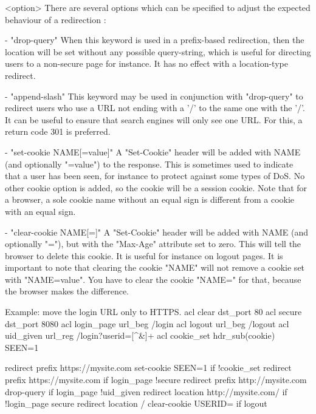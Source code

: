     <option>  There are several options which can be specified to adjust the
              expected behaviour of a redirection :

      - "drop-query"
        When this keyword is used in a prefix-based redirection, then the
        location will be set without any possible query-string, which is useful
        for directing users to a non-secure page for instance. It has no effect
        with a location-type redirect.

      - "append-slash"
        This keyword may be used in conjunction with "drop-query" to redirect
        users who use a URL not ending with a '/' to the same one with the '/'.
        It can be useful to ensure that search engines will only see one URL.
        For this, a return code 301 is preferred.

      - "set-cookie NAME[=value]"
        A "Set-Cookie" header will be added with NAME (and optionally "=value")
        to the response. This is sometimes used to indicate that a user has
        been seen, for instance to protect against some types of DoS. No other
        cookie option is added, so the cookie will be a session cookie. Note
        that for a browser, a sole cookie name without an equal sign is
        different from a cookie with an equal sign.

      - "clear-cookie NAME[=]"
        A "Set-Cookie" header will be added with NAME (and optionally "="), but
        with the "Max-Age" attribute set to zero. This will tell the browser to
        delete this cookie. It is useful for instance on logout pages. It is
        important to note that clearing the cookie "NAME" will not remove a
        cookie set with "NAME=value". You have to clear the cookie "NAME=" for
        that, because the browser makes the difference.

  Example: move the login URL only to HTTPS.
        acl clear      dst_port  80
        acl secure     dst_port  8080
        acl login_page url_beg   /login
        acl logout     url_beg   /logout
        acl uid_given  url_reg   /login?userid=[^&]+
        acl cookie_set hdr_sub(cookie) SEEN=1

        redirect prefix   https://mysite.com set-cookie SEEN=1 if !cookie_set
        redirect prefix   https://mysite.com           if login_page !secure
        redirect prefix   http://mysite.com drop-query if login_page !uid_given
        redirect location http://mysite.com/           if !login_page secure
        redirect location / clear-cookie USERID=       if logout

